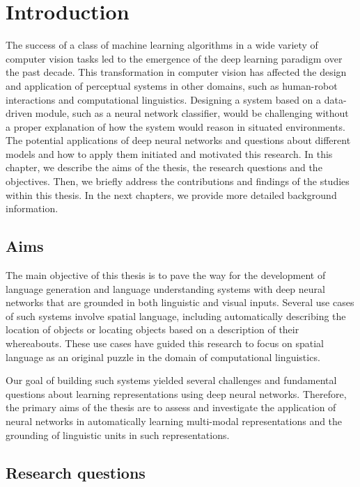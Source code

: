 \chapter{Introduction}
\label{sec:intro}

The success of a class of machine learning algorithms in a wide variety of computer vision tasks led to the emergence of the deep learning paradigm over the past decade. 
This transformation in computer vision has affected the design and application of perceptual systems in other domains, such as human-robot interactions and computational linguistics. 
Designing a system based on a data-driven module, such as a neural network classifier, would be challenging without a proper explanation of how the system would reason in situated environments. 
The potential applications of deep neural networks and questions about different models and how to apply them initiated and motivated this research.
In this chapter, we describe the aims of the thesis, the research questions and the objectives.
Then, we briefly address the contributions and findings of the studies within this thesis.
In the next chapters, we provide more detailed background information.

\section{Aims}
\label{sec:intro:aims}
The main objective of this thesis is to pave the way for the development of language generation and language understanding systems with deep neural networks that are grounded in both linguistic and visual inputs.
Several use cases of such systems involve spatial language, including automatically describing the location of objects or locating objects based on a description of their whereabouts.
These use cases have guided this research to focus on spatial language as an original puzzle in the domain of computational linguistics. 

Our goal of building such systems yielded several challenges and fundamental questions about learning representations using deep neural networks.
Therefore, the primary aims of the thesis are to assess and investigate the application of neural networks in automatically learning multi-modal representations and the grounding of linguistic units in such representations.



\section{Research questions}
\label{sec:intro:questions}

